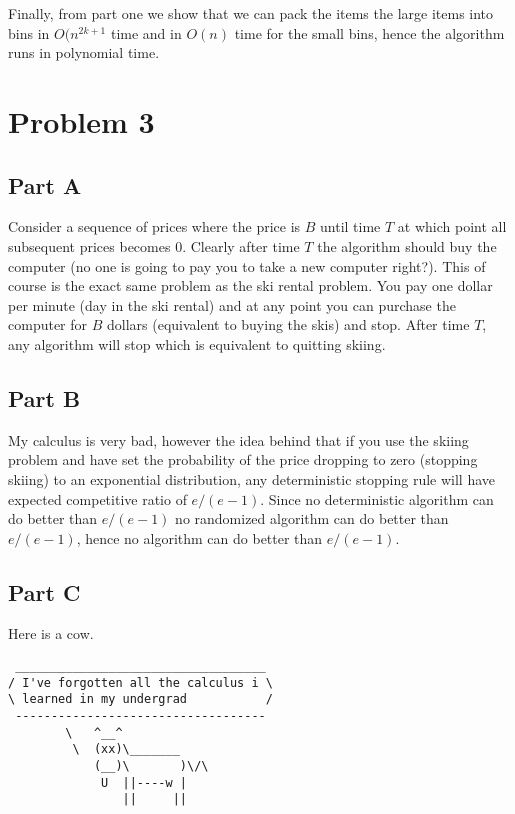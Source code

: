 \documentclass[a4paper]{article}
\begin{document}
Finally, from part one we show that we can pack the items the large items into bins in 
$O(n^{2k+1}$ time and in $O(n)$ time for the small bins, hence the algorithm runs in polynomial time.


\section{Problem 3}

\subsection{Part A}

Consider a sequence of prices where the price is $B$ until time $T$ at which point all subsequent prices becomes $0$.
Clearly after time $T$ the algorithm should buy the computer (no one is going to pay you to take a new computer right?).
This of course is the exact same problem as the ski rental problem. You pay one dollar per minute (day in the ski rental) 
and at any point you can purchase the computer for $B$ dollars (equivalent to buying the skis) and stop. After time $T$, 
any algorithm will stop which is equivalent to quitting skiing.

\subsection{Part B}

My calculus is very bad, however the idea behind that if you use the skiing problem and have set the probability of
the price dropping to zero (stopping skiing) to an exponential distribution, any deterministic stopping 
rule will have expected competitive ratio of $e/(e-1)$. Since no deterministic algorithm can do better than 
$e/(e-1)$ no randomized algorithm can do better than $e/(e-1)$, hence no algorithm can do better than $e/(e-1)$.

\subsection{Part C}

Here is a cow.
\begin{verbatim}
 ___________________________________
/ I've forgotten all the calculus i \
\ learned in my undergrad           /
 -----------------------------------
        \   ^__^
         \  (xx)\_______
            (__)\       )\/\
             U  ||----w |
                ||     ||
\end{verbatim}
\end{document}
